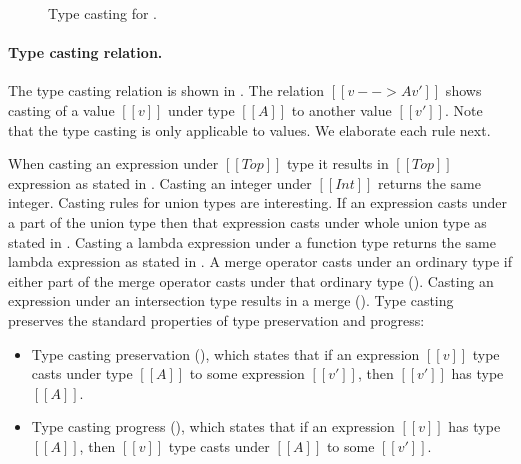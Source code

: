 
\begin{figure}[t]
  \begin{small}
    \centering
  \end{small}
  \caption{Type casting for \namems.}
  \label{fig:merge:cast}
\end{figure}


\paragraph{Type casting relation.}
The type casting relation is shown in .
The relation $[[v -->A v']]$ shows casting of a value $[[v]]$ under
type $[[A]]$ to another value $[[v']]$.
Note that the type casting is only applicable to values.
We elaborate each rule next.

When casting an expression under $[[Top]]$
type it results in $[[Top]]$ expression as stated in .
Casting an integer under $[[Int]]$ returns the same integer.
Casting rules for union types are interesting. If an expression casts
under a part of the union type then that expression casts under whole
union type as stated in .
Casting a lambda expression under a function type returns
the same lambda expression as stated in .
A merge operator casts under an ordinary type if either part of the merge
operator casts under that ordinary type (). 
Casting an expression under an intersection
type results in a merge ().
Type casting preserves the standard properties of
type preservation and progress:

\begin{itemize}
  \item Type casting preservation 
      (), which states that
      if an expression $[[v]]$ type casts under type $[[A]]$ to
      some expression $[[v']]$, then $[[v']]$ has type $[[A]]$.
  \item Type casting progress
      (), which states that if
      an expression $[[v]]$ has type $[[A]]$, then $[[v]]$
      type casts under $[[A]]$ to some $[[v']]$.
\end{itemize}

